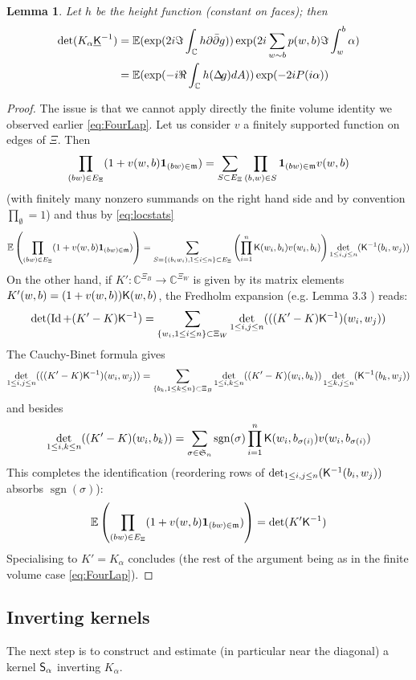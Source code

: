 \documentclass[10pt]{article}
\newcommand{\C}{\mathbb{C}}
\newcommand{\E}{\mathbb{E}}
\newcommand{\mf}{\mathfrak}
\newcommand{\ind}{{\bf 1}}
\newcommand{\rK}{{\sf K}}
\newcommand{\uK}{{\underline {\sf K}}}
\newcommand{\rS}{{\sf S}}
\newcommand{\mfm}{{\mathfrak m}}
\newcommand{\Lap}{\Delta\!}
\newcommand{\dbar}{\bar\partial}
\DeclareMathOperator{\Id}{Id}
\DeclareMathOperator{\sgn}{sgn}
\newtheorem{Lem}[thm]{Lemma}
\begin{document}
\begin{Lem}\label{Lem:detplane}
Let $h$ be the height function (constant on faces); then
\begin{align*}
\det(K_\alpha \uK^{-1})&=\E(\exp(2i\Im\int_\C h\partial\dbar g))\exp(2i\sum_{w\sim b}p(w,b)\Im\int_w^b\alpha)\\
&=\E(\exp(-i\Re\int_\C h(\Lap g)dA))\exp(-2iP(i\alpha))
\end{align*}
\end{Lem}
\begin{proof}
The issue is that we cannot apply directly the finite volume identity we observed earlier \eqref{eq:FourLap}. Let us consider $v$ a finitely supported function on edges of $\Xi$. Then
$$\prod_{(bw)\in E_\Xi}(1+v(w,b)\ind_{(bw)\in\mfm})=\sum_{S\subset E_\Xi}\prod_{(b,w)\in S}\ind_{(bw)\in\mfm}v(w,b)$$
(with finitely many nonzero summands on the right hand side and by convention $\prod_{\emptyset}=1$) and thus by \eqref{eq:locstats}
$$\E\left(\prod_{(bw)\in E_\Xi}(1+v(w,b)\ind_{(bw)\in\mfm})\right)
=\sum_{S=\{(b_iw_i),1\leq i\leq n\}\subset E_\Xi}\left(\prod_{i=1}^n\rK(w_i,b_i)v(w_i,b_i)\right)\det_{1\leq i,j\leq n}(\rK^{-1}(b_i,w_j))$$
On the other hand, if $K':\C^{\Xi_B}\rightarrow\C^{\Xi_W}$ is given by its matrix elements $K'(w,b)=(1+v(w,b))\rK(w,b)$, the Fredholm expansion (e.g. Lemma 3.3 \cite{SimTrace}) reads:
$$\det(\Id+(K'-K)\rK^{-1})
=\sum_{\{w_i,1\leq i\leq n\}\subset \Xi_W}\det_{1\leq i,j\leq n}(((K'-K)\rK^{-1})(w_i,w_j))$$
The Cauchy-Binet formula gives
$$\det_{1\leq i,j\leq n}(((K'-K)\rK^{-1})(w_i,w_j))
=\sum_{\{b_k,1\leq k\leq n\}\subset \Xi_B}\det_{1\leq i,k\leq n}((K'-K)(w_i,b_k))\det_{1\leq k,j\leq n}(\rK^{-1}(b_k,w_j))
$$
and besides
$$\det_{1\leq i,k\leq n}((K'-K)(w_i,b_k))=\sum_{\sigma\in{\mf S}_n}\sgn(\sigma)\prod_{i=1}^n\rK(w_i,b_{\sigma(i)})v(w_i,b_{\sigma(i)})$$ 
This completes the identification (reordering rows of $\det_{1\leq i,j\leq n}(\rK^{-1}(b_i,w_j))$ absorbs $\sgn(\sigma)$):
$$\E\left(\prod_{(bw)\in E_\Xi}(1+v(w,b)\ind_{(bw)\in\mfm})\right)=\det(K'\rK^{-1})$$
Specialising to $K'=K_\alpha$ concludes (the rest of the argument being as in the finite volume case \eqref{eq:FourLap}).
\end{proof}


\subsection{Inverting kernels}\label{subsec:planarinvker}

The next step is to construct and estimate (in particular near the diagonal) a kernel $\rS_\alpha$ inverting $K_\alpha$.
\end{document}
